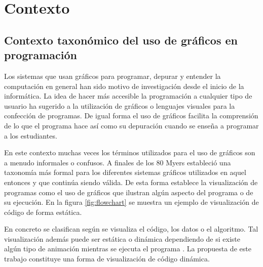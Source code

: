 \documentclass{llncs}
\begin{document}
%
%
\section{Contexto}
\label{sec:background}

\subsection{Contexto taxonómico del uso de gráficos en programación}
\label{subsec:taxonomy}
Los sistemas que usan gráficos para programar, depurar y entender la computación en general han sido motivo de investigación desde el inicio de la informática. La idea de hacer más accesible la programación a cualquier tipo de usuario ha sugerido a la utilización de gráficos o lenguajes visuales para la confección de programas. De igual forma el uso de gráficos facilita la comprensión de lo que el programa hace así como su depuración cuando se enseña a programar a los estudiantes. 

En este contexto muchas veces los términos utilizados para el uso de gráficos son a menudo informales o confusos. A finales de los 80 Myers \cite{myers1990taxonomies} estableció una taxonomía más formal para los diferentes sistemas gráficos utilizados en aquel entonces y que continúa siendo válida. De esta forma establece la visualización de programas como el uso de gráficos que ilustran algún aspecto del programa o de su ejecución. En la figura \ref{fig:flowchart} se muestra un ejemplo de visualización de código de forma estática. 

En concreto se clasifican según se visualiza el código, los datos o el algoritmo. Tal visualización además puede ser estática o dinámica dependiendo de si existe algún tipo de animación mientras se ejecuta el programa \cite{urquiza2009survey}. La propuesta de este trabajo constituye una forma de visualización de código dinámica. 
\end{document}
